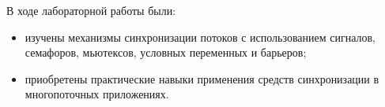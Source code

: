 


%


В ходе лабораторной работы были:  
\begin{itemize}
	\item изучены механизмы синхронизации потоков с использованием сигналов, семафоров, мьютексов, условных переменных и барьеров;
	\item приобретены практические навыки применения средств синхронизации в многопоточных приложениях.
\end{itemize}


